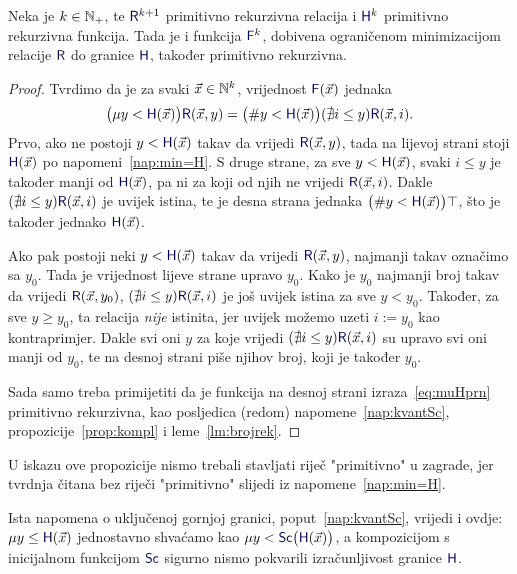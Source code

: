 \begin{propozicija}[{name=[ograničena minimizacija čuva primitivnu rekurzivnost]}]\label{prop:muHprn}
Neka je $k\in{\mathbb N}_+$, te $\f R^{k+1}$\! primitivno rekurzivna relacija i $\f H^k$ primitivno rekurzivna funkcija. Tada je i funkcija $\f F^k$\!, dobivena ograničenom minimizacijom relacije $\f R$ do granice $\f H$, također primitivno rekurzivna.
\end{propozicija}
\begin{proof}
Tvrdimo da je za svaki $\vec x\in{\mathbb N}^k$, vrijednost $\f F(\vec x)$ jednaka
    \begin{equation}\label{eq:muHprn}
        \bigl(\mu y<\f H(\vec x)\bigr)\f R(\vec x,y)
        =
        \bigl(\# y<\f H(\vec x)\bigr)(\nexists i\le y)\f R(\vec x,i).
    \end{equation}
Prvo, ako ne postoji $y<\f H(\vec x)$ takav da vrijedi $\f R(\vec x,y)$, tada na lijevoj strani stoji $\f H(\vec x)$ po napomeni~\ref{nap:min=H}. S druge strane, za sve $y<\f H(\vec x)$, svaki $i\le y$ je također manji od $\f H(\vec x)$, pa ni za koji od njih ne vrijedi $\f R(\vec x,i)$. Dakle $(\nexists i\le y)\f R(\vec x,i)$ je uvijek istina, te je desna strana jednaka $\bigl(\#y<\f H(\vec x)\bigr)\top$, što je također jednako $\f H(\vec x)$.
    
Ako pak postoji neki $y<\f H(\vec x)$ takav da vrijedi $\f R(\vec x,y)$, najmanji takav označimo sa $y_0$. Tada je vrijednost lijeve strane upravo $y_0$. Kako je $y_0$ najmanji broj takav da vrijedi $\f R(\vec x,y_0)$, $(\nexists i\le y)\f R(\vec x,i)$ je još uvijek istina za sve $y<y_0$. Također, za sve $y\ge y_0$, ta relacija \emph{nije} istinita, jer uvijek možemo uzeti $i:=y_0$ kao kontraprimjer. Dakle svi oni $y$ za koje vrijedi $(\nexists i\le y)\f R(\vec x,i)$ su upravo svi oni manji od $y_0$, te na desnoj strani piše njihov broj, koji je također $y_0$.
 
Sada samo treba primijetiti da je funkcija na desnoj strani izraza~\eqref{eq:muHprn} primitivno rekurzivna, kao posljedica (redom) napomene~\ref{nap:kvantSc}, propozicije~\ref{prop:kompl} i leme~\ref{lm:brojrek}.
\end{proof}
U iskazu ove propozicije nismo trebali stavljati riječ "primitivno" u zagrade, jer tvrdnja čitana bez riječi "primitivno" slijedi iz napomene~\ref{nap:min=H}.

\begin{napomena}[{name=[uključena gornja granica ograničene minimizacije]}]\label{nap:muSc}
Ista napomena o uključenoj gornjoj granici, poput~\ref{nap:kvantSc}, vrijedi i ovdje:
$\mu y\le\f H(\vec x)$ jednostavno shvaćamo kao $\mu y<\f{Sc}\bigl(\f H(\vec x)\bigr)$, a kompozicijom s inicijalnom funkcijom $\f{Sc}$ sigurno nismo pokvarili izračunljivost granice $\f H$.
\end{napomena}
